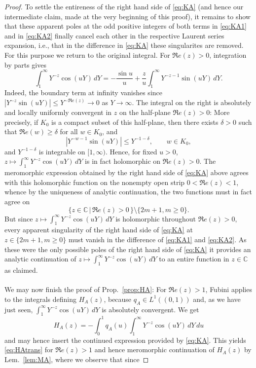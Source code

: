 \documentclass[10pt,a4paper]{amsart}
\newcommand{\C}{\mathbb C}
\begin{document}
\begin{proof}
To settle the entireness of the right hand side of \eqref{eq:KA} (and hence our intermediate claim, made at the very beginning of this proof), it remains to show that these apparent poles at the odd positive integers of both terms in \eqref{eq:KA1} and in \eqref{eq:KA2} finally cancel each other in the respective Laurent series expansion, i.e., that in the difference in \eqref{eq:KA} these singularites are removed. For this purpose we return to the original integral.  For $\Re e(z)>0$, integration by parts gives
$$\int_1^\infty Y^{-z}\cos(uY)\,dY=-\frac{\sin u}{u}+\frac{z}{u} \int_1^\infty Y^{-z-1}\sin(uY)\,dY.$$
Indeed, the boundary term at infinity vanishes since $|Y^{-z}\sin(uY)|\le Y^{-\Re e(z)}\longrightarrow 0$ as $Y\to\infty$. The integral on the right is absolutely and locally uniformly convergent in $z$ on the half-plane $\Re e(z)>0$:  More precisely, if $K_0$ is a compact subset of this half-plane, then there exists $\delta>0$ such that $\Re e(w)\ge\delta$ for all $w\in K_0$, and
$$|Y^{-w-1}\sin(uY)| \le Y^{-1-\delta}, \qquad w\in K_0,
$$
and $Y^{-1-\delta}$ is integrable on $[1,\infty)$.  Hence, for fixed $u>0$, $z\mapsto \int_1^\infty Y^{-z}\cos(uY)\,dY$ is in fact holomorphic on $\Re e(z)>0$. The meromorphic expression obtained by the right hand side of \eqref{eq:KA} above agrees with this holomorphic function on the nonempty open strip $0<\Re e(z)<1$, whence by the uniqueness of analytic continuation, the two functions must in fact agree on
$$
\{z\in\C\,| \,\Re e(z)>0\,\}\setminus\{2m+1, m\geq 0\}.
$$
But since $z\mapsto \int_1^\infty Y^{-z}\cos(uY)\,dY$ is holomorphic throughout $\Re e(z)>0$, every apparent singularity of the right hand side of \eqref{eq:KA} at
$z\in \{2m+1, m\geq 0\}$ must vanish in the difference of \eqref{eq:KA1} and \eqref{eq:KA2}. As these were the only possible poles of the right hand side of \eqref{eq:KA} it provides an analytic continuation of $z\mapsto \int_1^\infty Y^{-z}\cos(uY)\,dY$ to an entire function in $z\in\C$ as claimed.\\\\
We may now finish the proof of Prop.\ \ref{prop:HA}: For $\Re e(z)>1$, Fubini applies to the integrals defining $H_A(z)$, because $q_A\in L^1((0,1))$ and, as we have just seen, $\int_1^\infty Y^{-z}\cos(uY)\,dY$ is absolutely convergent. We get
$$
H_A(z)=-\int_0^1q_A(u)\int_1^\infty Y^{-z}\cos(uY)\,dY\,du
$$
and may hence insert the continued expression provided by \eqref{eq:KA}. This yields \eqref{eq:HAtrans} for $\Re e(z)>1$ and hence meromorphic continuation of $H_A(z)$ by Lem.\ \ref{lem:MA}, where we observe that since

\end{proof}
\end{document}
